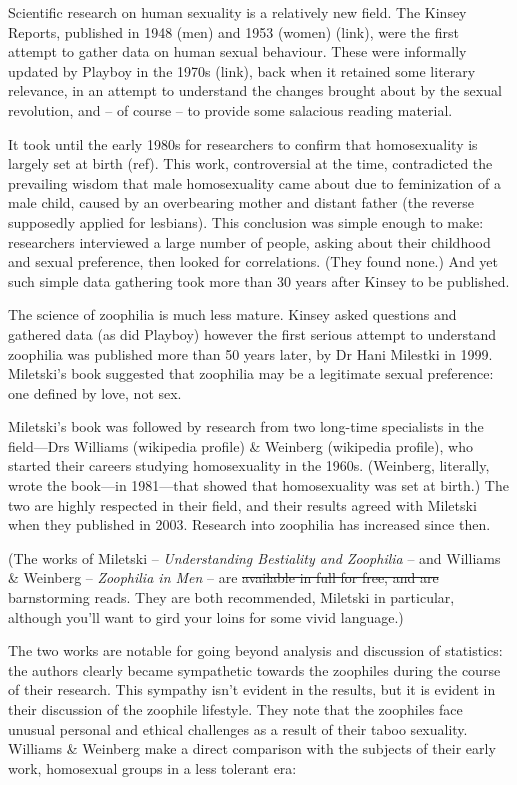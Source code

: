 
Scientific research on human sexuality is a relatively new field. The Kinsey Reports, published in 1948 (men) and 1953 (women) (link), were the first attempt to gather data on human sexual behaviour. These were informally updated by Playboy in the 1970s (link), back when it retained some literary relevance, in an attempt to understand the changes brought about by the sexual revolution, and -- of course -- to provide some salacious reading material.

It took until the early 1980s for researchers to confirm that homosexuality is largely set at birth (ref). This work, controversial at the time, contradicted the prevailing wisdom that male homosexuality came about due to feminization of a male child, caused by an overbearing mother and distant father (the reverse supposedly applied for lesbians). This conclusion was simple enough to make: researchers interviewed a large number of people, asking about their childhood and sexual preference, then looked for correlations. (They found none.) And yet such simple data gathering took more than 30 years after Kinsey to be published.

The science of zoophilia is much less mature. Kinsey asked questions and gathered data (as did Playboy) however the first serious attempt to understand zoophilia was published more than 50 years later, by Dr Hani Milestki in 1999. Miletski's book suggested that zoophilia may be a legitimate sexual preference: one defined by love, not sex.

Miletski's book was followed by research from two long-time specialists in the field—Drs Williams (wikipedia profile) \& Weinberg (wikipedia profile), who started their careers studying homosexuality in the 1960s. (Weinberg, literally, wrote the book—in 1981—that showed that homosexuality was set at birth.) The two are highly respected in their field, and their results agreed with Miletski when they published in 2003. Research into zoophilia has increased since then.

(The works of Miletski -- \textit{Understanding Bestiality and Zoophilia} -- and Williams \& Weinberg -- \textit{Zoophilia in Men} -- are \sout{available in full for free, and are} barnstorming reads. They are both recommended, Miletski in particular, although you'll want to gird your loins for some vivid language.)

The two works are notable for going beyond analysis and discussion of statistics: the authors clearly became sympathetic towards the zoophiles during the course of their research. This sympathy isn't evident in the results, but it is evident in their discussion of the zoophile lifestyle. They note that the zoophiles face unusual personal and ethical challenges as a result of their taboo sexuality. Williams \& Weinberg make a direct comparison with the subjects of their early work, homosexual groups in a less tolerant era:

